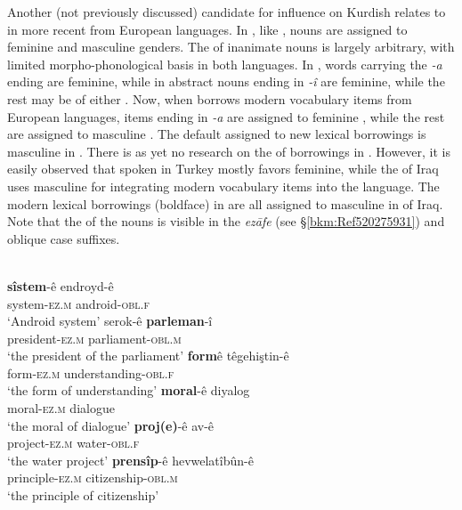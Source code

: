 \documentclass[output=paper]{langsci/langscibook}
\begin{document}
Another (not previously discussed) candidate for  influence on  Kurdish relates to  in more recent  from European languages. In , like , nouns are assigned to feminine and masculine genders. The  of inanimate nouns is largely arbitrary, with limited morpho-phonological basis in both languages. In , words carrying the \textit{{}-a} ending are feminine, while in  abstract nouns ending in \textit{-î} are feminine, while the rest may be of either . Now, when  borrows modern vocabulary items from European languages, items ending in \textit{{}-a} are assigned to feminine , while the rest are assigned to masculine  \citep[5]{Ibrahim2015}. The default  assigned to new lexical borrowings is masculine in . There is as yet no research on the  of borrowings in . However, it is easily observed that  spoken in Turkey mostly favors feminine, while the  of Iraq uses masculine  for integrating modern vocabulary items into the language. The modern lexical borrowings (boldface) in  are all assigned to masculine  in   of Iraq. Note that the  of the nouns is visible in the \textit{ezāfe} (see §\ref{bkm:Ref520275931}) and oblique case suffixes. 

{}\label{bkm:Ref14712415}\\
\ea 
\gll \textbf{sîstem}-ê endroyd-ê\\
     system-\textsc{ez.m} android-\textsc{obl.f}\\
\glt ‘Android system’
\ex\label{parl}
\gll serok-ê \textbf{parleman}-î\\
     president-\textsc{ez.m} parliament-\textsc{obl.m}\\
\glt ‘the president of the parliament’
\ex \gll \textbf{form}ê têgehiştin-ê\\
     form-\textsc{ez.m} understanding\textsc{{}-obl.f}\\
\glt ‘the form of understanding’
\ex \gll \textbf{moral}-ê diyalog\\
     moral-\textsc{ez.m} dialogue\\
\glt ‘the moral of dialogue’
\ex \gll \textbf{proj(e)}-ê av-ê\\
     project-\textsc{ez.m} water-\textsc{obl.f}\\
\glt ‘the water project’
\ex
\gll \textbf{prensîp}-ê hevwelatîbûn-ê\\
     principle-\textsc{ez.m} citizenship-\textsc{obl.m}\\
\glt ‘the principle of citizenship’
\z
\z
\end{document}
